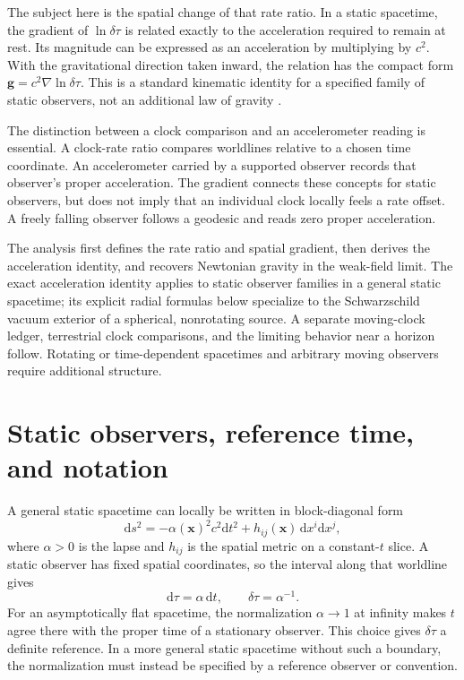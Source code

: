 \documentclass[12pt]{article}
\begin{document}
The subject here is the spatial change of that rate ratio. In a static spacetime, the gradient of $\ln\delta\tau$ is related exactly to the acceleration required to remain at rest. Its magnitude can be expressed as an acceleration by multiplying by $c^2$. With the gravitational direction taken inward, the relation has the compact form $\mathbf{g}=c^2\nabla\ln\delta\tau$. This is a standard kinematic identity for a specified family of static observers, not an additional law of gravity \cite{Wald,TaylorWheeler,SantiagoVisser}.

The distinction between a clock comparison and an accelerometer reading is essential. A clock-rate ratio compares worldlines relative to a chosen time coordinate. An accelerometer carried by a supported observer records that observer's proper acceleration. The gradient connects these concepts for static observers, but does not imply that an individual clock locally feels a rate offset. A freely falling observer follows a geodesic and reads zero proper acceleration.

The analysis first defines the rate ratio and spatial gradient, then derives the acceleration identity, and recovers Newtonian gravity in the weak-field limit. The exact acceleration identity applies to static observer families in a general static spacetime; its explicit radial formulas below specialize to the Schwarzschild vacuum exterior of a spherical, nonrotating source. A separate moving-clock ledger, terrestrial clock comparisons, and the limiting behavior near a horizon follow. Rotating or time-dependent spacetimes and arbitrary moving observers require additional structure.

\section{Static observers, reference time, and notation}

A general static spacetime can locally be written in block-diagonal form
\begin{equation}
  \mathrm{d}s^2=-\alpha(\mathbf{x})^2c^2\mathrm{d}t^2
    +h_{ij}(\mathbf{x})\,\mathrm{d}x^i\mathrm{d}x^j,
  \label{eq:static-metric}
\end{equation}
where $\alpha>0$ is the lapse and $h_{ij}$ is the spatial metric on a constant-$t$ slice. A static observer has fixed spatial coordinates, so the interval along that worldline gives
\begin{equation}
  \mathrm{d}\tau=\alpha\,\mathrm{d}t,
  \qquad
  \delta\tau=\alpha^{-1}.
  \label{eq:static-rate}
\end{equation}
For an asymptotically flat spacetime, the normalization $\alpha\to1$ at infinity makes $t$ agree there with the proper time of a stationary observer. This choice gives $\delta\tau$ a definite reference. In a more general static spacetime without such a boundary, the normalization must instead be specified by a reference observer or convention.
\end{document}
